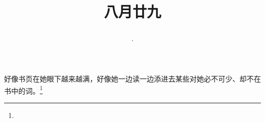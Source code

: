 \title{\date[d=1,m=10,y=2024][year:cn-y,年,month:cn,day:cn,日,·,weekday]·八月廿九 }
好像书页在她眼下越来越满，好像她一边读一边添进去某些对她必不可少、却不在书中的词。\footnote{ }

